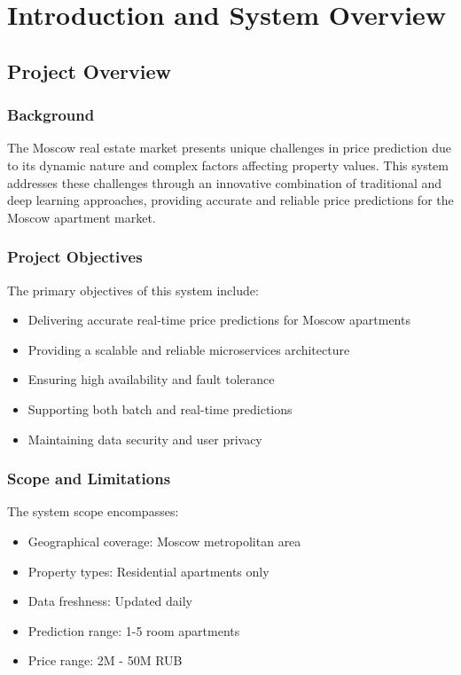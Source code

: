 \documentclass[12pt,a4paper]{report}
\begin{document}
\tableofcontents

\listoftables
\listoffigures

\chapter{Introduction and System Overview}
\section{Project Overview}
\subsection{Background}
The Moscow real estate market presents unique challenges in price prediction due to its dynamic nature and complex factors affecting property values. This system addresses these challenges through an innovative combination of traditional and deep learning approaches, providing accurate and reliable price predictions for the Moscow apartment market.

\subsection{Project Objectives}
The primary objectives of this system include:
\begin{itemize}
    \item Delivering accurate real-time price predictions for Moscow apartments
    \item Providing a scalable and reliable microservices architecture
    \item Ensuring high availability and fault tolerance
    \item Supporting both batch and real-time predictions
    \item Maintaining data security and user privacy
\end{itemize}

\subsection{Scope and Limitations}
The system scope encompasses:
\begin{itemize}
    \item Geographical coverage: Moscow metropolitan area
    \item Property types: Residential apartments only
    \item Data freshness: Updated daily
    \item Prediction range: 1-5 room apartments
    \item Price range: 2M - 50M RUB
\end{itemize}
\end{document}
